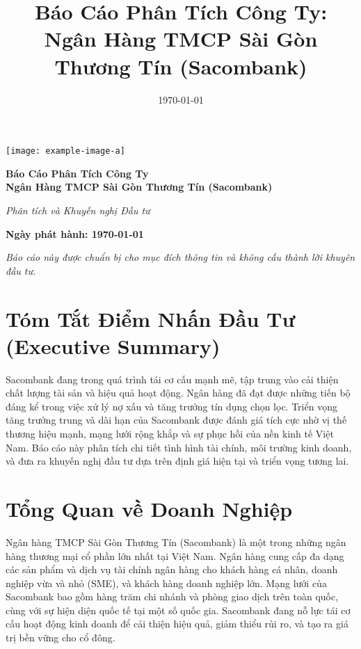 \documentclass[12pt]{article}
\title{Báo Cáo Phân Tích Công Ty: Ngân Hàng TMCP Sài Gòn Thương Tín (Sacombank)}
\author{}
\date{\today}
\begin{document}
\begin{titlepage}
\centering

\vspace*{1cm}

\texttt{[image: example-image-a]} %

\vspace{2cm}

{\Huge \textbf{Báo Cáo Phân Tích Công Ty}}\\
\vspace{0.5cm}
{\Huge \textbf{Ngân Hàng TMCP Sài Gòn Thương Tín (Sacombank)}}

\vspace{2cm}

\large \textit{Phân tích và Khuyến nghị Đầu tư}

\vspace{3cm}

\textbf{Ngày phát hành: \today}

\vfill

\textit{Báo cáo này được chuẩn bị cho mục đích thông tin và không cấu thành lời khuyên đầu tư.}

\end{titlepage}

\tableofcontents

\section{Tóm Tắt Điểm Nhấn Đầu Tư (Executive Summary)}

Sacombank đang trong quá trình tái cơ cấu mạnh mẽ, tập trung vào cải thiện chất lượng tài sản và hiệu quả hoạt động. Ngân hàng đã đạt được những tiến bộ đáng kể trong việc xử lý nợ xấu và tăng trưởng tín dụng chọn lọc. Triển vọng tăng trưởng trung và dài hạn của Sacombank được đánh giá tích cực nhờ vị thế thương hiệu mạnh, mạng lưới rộng khắp và sự phục hồi của nền kinh tế Việt Nam. Báo cáo này phân tích chi tiết tình hình tài chính, môi trường kinh doanh, và đưa ra khuyến nghị đầu tư dựa trên định giá hiện tại và triển vọng tương lai.

\section{Tổng Quan về Doanh Nghiệp}

Ngân hàng TMCP Sài Gòn Thương Tín (Sacombank) là một trong những ngân hàng thương mại cổ phần lớn nhất tại Việt Nam. Ngân hàng cung cấp đa dạng các sản phẩm và dịch vụ tài chính ngân hàng cho khách hàng cá nhân, doanh nghiệp vừa và nhỏ (SME), và khách hàng doanh nghiệp lớn. Mạng lưới của Sacombank bao gồm hàng trăm chi nhánh và phòng giao dịch trên toàn quốc, cùng với sự hiện diện quốc tế tại một số quốc gia. Sacombank đang nỗ lực tái cơ cấu hoạt động kinh doanh để cải thiện hiệu quả, giảm thiểu rủi ro, và tạo ra giá trị bền vững cho cổ đông.
\end{document}
